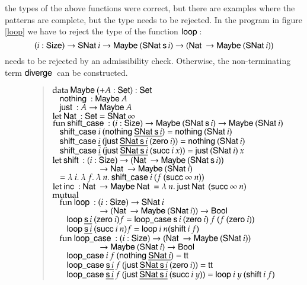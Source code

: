 the types of the above functions were correct, 
but there are examples where the patterns are complete, but the type needs to be rejected.
In the \mugda program in figure \ref{loop} we have to reject the  type of the function $\lop$: 
\[\EPi{i}{\Size}{\SNat i \ra \Maybe (\SNat \s i) \ra (\Nat \ra \Maybe (\SNat i))} \]
needs to be rejected by an admissibility check.
Otherwise, the non-terminating term $\diverge$ can be constructed.
\begin{figure}
\begin{quote}
$\data \Maybe ( + A : \Set ) : \Set$\\
$\spc  \nothing : \Maybe A$\\
$\spc  \just : A \ra\Maybe A$\\

$\clet \Nat : \Set = \SNat \infty$\\

$\fun \shiftcase : (i : \Size) \ra\Maybe (\SNat \s i) \ra\Maybe (\SNat i)$\\
$\spc \shiftcase i \: (\nothing \inacc{\SNat \s i}) = \nothing (\SNat i)$\\
$\spc \shiftcase \inacc{i} \: (\just \inacc{\SNat \s i} \: (\zero i)) = \nothing (\SNat i)$\\
$\spc \shiftcase \inacc{i} \: (\just \inacc{\SNat \s i} \: (\suc i \: x)) = \just (\SNat i) \: x$\\

$\clet \shift : (i : \Size) \ra(\Nat \ra \Maybe (\SNat \s i)) $\\
$\spcx \spcx \ra\Nat \ra \Maybe (\SNat i) $\\ 
$\spc = \lam{i}{\lam{f}{\lam{n}{\shiftcase i \: (f \: (\suc \infty \: n))}}}$\\

$\clet \inc : \Nat \ra \Maybe \Nat = \lam{n}{\just \Nat \: (\suc \infty \: n)}$\\

$\mutual$\\
$\spc \fun \lop : (i : \Size ) \ra \SNat i $\\
$\spcx \spcx \ra (\Nat \ra\Maybe (\SNat i)) \ra\Bool$\\
$\spc \spc \lop \inacc{\s i} \: (\zero i) f = \lopcase \s i \: (\zero i) \: f \: (f \: (\zero i))$\\
$\spc \spc \lop \inacc{\s i} \: (\suc i \: n) f = \lop i \: n (\shift i \: f)$\\

$\spc \fun \lopcase : (i : \Size ) \ra (\Nat \ra \Maybe (\SNat i)) $\\
$\spcx \spcx \ra \Maybe (\SNat i) \ra\Bool$\\
$\spc \spc \lopcase i \: f \: (\nothing \inacc{\SNat i}) = \ttt $\\
$\spc \spc \lopcase \inacc{\s i} \: f \: (\just \inacc{\SNat \s i} \: (\zero i)) = \ttt $\\
$\spc \spc \lopcase \inacc{\s i} \: f \: (\just \inacc{\SNat \s i} \: (\suc i \: y)) = \lop i \: y \: (\shift i \:f) $\\


\end{quote}
\end{figure}

